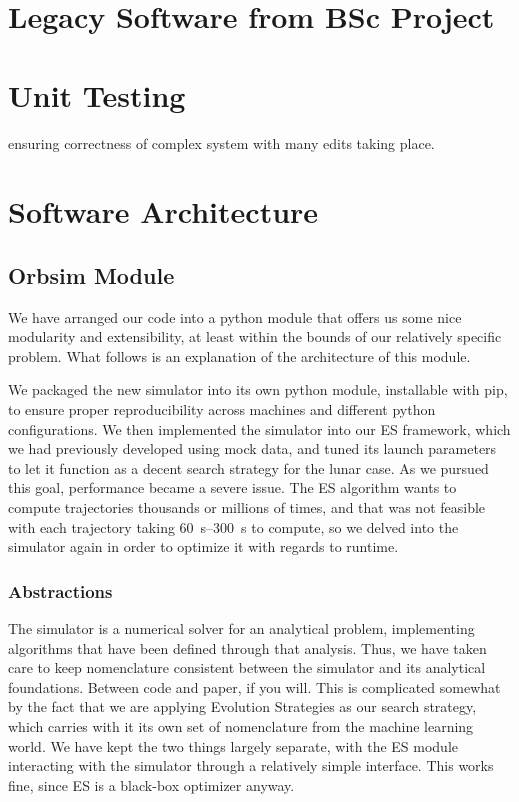 \section{Legacy Software from BSc Project}
\section{Unit Testing}
ensuring correctness of complex system with many edits taking place.
\section{Software Architecture}
\subsection{Orbsim Module}
We have arranged our code into a python module that offers us some nice modularity and extensibility, at least within the bounds of our relatively specific problem. What follows is an explanation of the architecture of this module.

We packaged the new simulator into its own python module, installable with pip, to ensure proper reproducibility across machines and different python configurations. We then implemented the simulator into our ES framework, which we had previously developed using mock data, and tuned its launch parameters to let it function as a decent search strategy for the lunar case. As we pursued this goal, performance became a severe issue. The ES algorithm wants to compute trajectories thousands or millions of times, and that was not feasible with each trajectory taking \SIrange{60}{300}{\second} to compute, so we delved into the simulator again in order to optimize it with regards to runtime.

\subsubsection{Abstractions}

The simulator is a numerical solver for an analytical problem, implementing algorithms that have been defined through that analysis. Thus, we have taken care to keep nomenclature consistent between the simulator and its analytical foundations. Between code and paper, if you will. This is complicated somewhat by the fact that we are applying Evolution Strategies as our search strategy, which carries with it its own set of nomenclature from the machine learning world. We have kept the two things largely separate, with the ES module interacting with the simulator through a relatively simple interface. This works fine, since ES is a black-box optimizer anyway.

